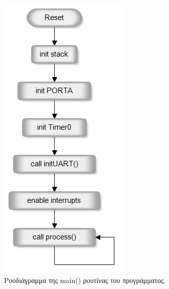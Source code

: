 \documentclass[a4paper,12pt]{article}
\begin{document}
\begin{figure}[h!]
\centering
\includegraphics[scale=0.75]{main.png}
\caption{Ροοδιάγραμμα της main() ρουτίνας του προγράμματος.}
\label{fig:main_flo}
\end{figure}
\end{document}
